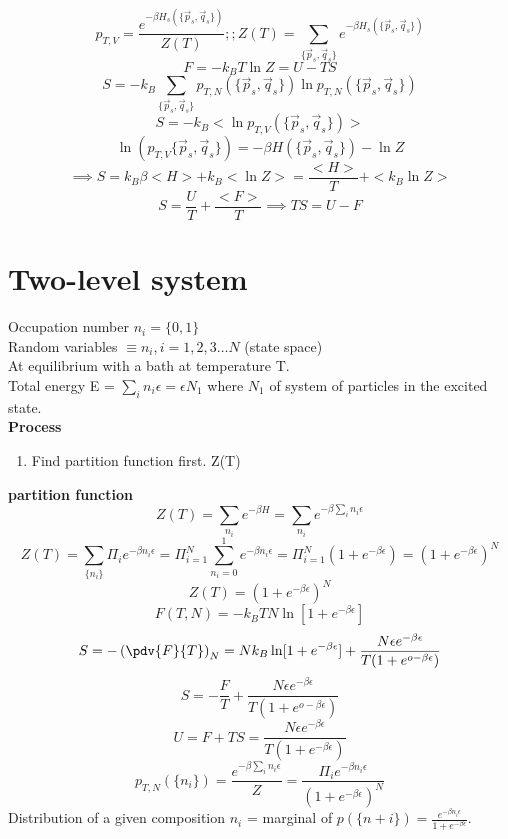 \[
    p_{T,V} = \frac{e^{- \beta H_s (\{\vec{p}_s,\vec{q}_s\})}}{Z(T)};; Z(T) = \sum\limits_{\{\vec{p}_s,\vec{q}_s\}} e^{-\beta H_s(\{\vec{p}_s,\vec{q}_s\})}
\]
\[
    F = - k_B T \ln  Z = U - TS
\]
\[
    S = - k_B \sum\limits_{\{\vec{p}_s,\vec{q}_s\}}p_{T,N}(\{\vec{p}_s,\vec{q}_s\})\ln p_{T,N}(\{\vec{p}_s,\vec{q}_s\})
\]
\[
    S = - k_{B} <\ln p_{T,V}(\{\vec{p}_s,\vec{q}_s\})>
\]
\[
    \ln (p_{T,V} \{\vec{p}_s,\vec{q}_s\}) = - \beta H(\{\vec{p}_s,\vec{q}_s\}) - \ln Z
\]
\[
    \implies S = k_B \beta <H> + k_B <\ln Z> = \frac{<H>}{T} + <k_B \ln Z>
\]
\[
    S = \frac{U}{T} + \frac{<F>}{T} \implies TS = U - F
\]
\section{Two-level system}
Occupation number \(n_i = \{0,1\}\) \\
Random variables \(\equiv {n_i, i = 1,2,3\ldots N }\) (state space)\\
At equilibrium with a bath at temperature T.\\
Total energy E = \(\sum\limits_{i} n_i \epsilon = \epsilon N_1\) where \(N_1\)  of system of particles in the excited state. \\
\textbf{Process} 
\begin{enumerate}
    \item Find partition function first. Z(T)
\end{enumerate}
\textbf{partition function} 
\[
    Z(T) = \sum\limits_{n_i} e^{-\beta H}  = \sum\limits_{n_i} e^{-\beta \sum\limits_{i}n_i \epsilon  }
\]
\[
    Z(T) = \sum\limits_{\{n_i\}} \Pi_{i} e^{-\beta n_i \epsilon } = \Pi_{i=1}^{N}\sum\limits_{n_i=0}^{1} e^{-\beta n_i \epsilon } = \Pi_{i=1}^{N} (1+ e^{-\beta \epsilon } ) = (1+e^{-\beta \epsilon })^N
    \]
\[
    Z(T) = (1+e^{-\beta \epsilon })^N
\]
\[
    F(T,N) = - k_B T N \ln [1+ e^{-\beta \epsilon }]
\]
\[
    S = -\left(\pdv{F}{T}\right)_N = Nk_B \ln [1+e^{-\beta \epsilon }]+\frac{N \epsilon e^{-\beta \epsilon }}{T(1+e^{o-\beta \epsilon })}
\]
\[
    \boxed{S = -\frac{F}{T}+ \frac{N \epsilon e^{-\beta \epsilon }}{T(1+e^{o-\beta \epsilon }) }}
\]
\[
    \boxed{U = F+TS = \frac{N \epsilon e^{-\beta \epsilon }}{T(1+e^{-\beta \epsilon })}}
\]
\[
    p_{T,N}(\{n_i\}) = \frac{e^{-\beta \sum\limits_{i}n_i \epsilon  }}{Z} = \frac{\Pi_i  e^{-\beta n_i \epsilon }}{(1+e^{-\beta \epsilon })^N}
\]
Distribution of a given composition \(n_i\) = marginal of \(p(\{n+i\}) = \frac{e^{-\beta n_i \epsilon } }{1+e^{-\beta \epsilon }}\).
